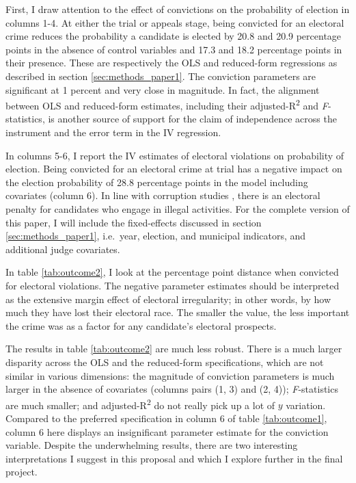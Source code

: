 \documentclass[11pt]{article}
\begin{document}


First, I draw attention to the effect of convictions on the probability of election in columns 1-4. At either the trial or appeals stage, being convicted for an electoral crime reduces the probability a candidate is elected by 20.8 and 20.9 percentage points in the absence of control variables and 17.3 and 18.2 percentage points in their presence. These are respectively the OLS and reduced-form regressions as described in section \ref{sec:methods_paper1}. The conviction parameters are significant at 1 percent and very close in magnitude. In fact, the alignment between OLS and reduced-form estimates, including their adjusted-R\textsuperscript{2} and \emph{F}-statistics, is another source of support for the claim of independence across the instrument and the error term in the IV regression.

In columns 5-6, I report the IV estimates of electoral violations on probability of election. Being convicted for an electoral crime at trial has a negative impact on the election probability of 28.8 percentage points in the model including covariates (column 6). In line with corruption studies \citep{FerrazElectoralAccountabilityCorruption2011a,ChongLookingIncumbentExposing2013}, there is an electoral penalty for candidates who engage in illegal activities. For the complete version of this paper, I will include the fixed-effects discussed in section \ref{sec:methods_paper1}, i.e.~year, election, and municipal indicators, and additional judge covariates.

In table \ref{tab:outcome2}, I look at the percentage point distance when convicted for electoral violations. The negative parameter estimates should be interpreted as the extensive margin effect of electoral irregularity; in other words, by how much they have lost their electoral race. The smaller the value, the less important the crime was as a factor for any candidate's electoral prospects.
\clearpage


The results in table \ref{tab:outcome2} are much less robust. There is a much larger disparity across the OLS and the reduced-form specifications, which are not similar in various dimensions: the magnitude of conviction parameters is much larger in the absence of covariates (columns pairs (1, 3) and (2, 4)); \emph{F}-statistics are much smaller; and adjusted-R\textsuperscript{2} do not really pick up a lot of $y$ variation. Compared to the preferred specification in column 6 of table \ref{tab:outcome1}, column 6 here displays an insignificant parameter estimate for the conviction variable. Despite the underwhelming results, there are two interesting interpretations I suggest in this proposal and which I explore further in the final project.
\end{document}
